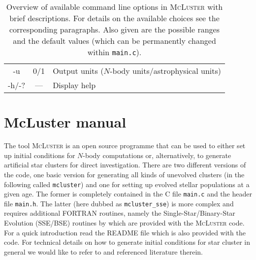 \documentclass[useAMS,usenatbib]{mn2e}
\begin{document}
\begin{table*}
\begin{minipage}{\textwidth}
{\begin{tabular}{ccl}
      -u  & 0/1 & Output units ($N$-body units/astrophysical units)\\           
      -h/-? & --- & Display help                                        
\end{tabular}
}
\caption{Overview of available command line options in \textsc{McLuster} with brief descriptions. For details on the available choices see the corresponding paragraphs. Also given are the possible ranges and the default values (which can be permanently changed within \texttt{main.c}).}
\end{minipage}
\label{overviewtable}
\end{table*}

\section*{McLuster manual}
\noindent The tool \textsc{McLuster} is an open source programme that can be used to either set up initial conditions for $N$-body computations or, alternatively, to generate artificial star clusters for direct investigation. There are two different versions of the code, one basic version for generating all kinds of unevolved clusters (in the following called \texttt{mcluster}) and one for setting up evolved stellar populations at a given age. The former is completely contained in the \textsc{C} file \texttt{main.c} and the header file \texttt{main.h}. The latter (here dubbed as \texttt{mcluster\_sse}) is more complex and requires additional \textsc{FORTRAN} routines, namely the Single-Star/Binary-Star Evolution (\textsc{SSE/BSE}) routines by \citet{Hurley00, Hurley02} which are provided with the \textsc{McLuster} code. For a quick introduction read the README file which is also provided with the code. For technical details on how to generate initial conditions for star cluster in general we would like to refer to \citet{Kroupa08} and referenced literature therein. 
\end{document}
